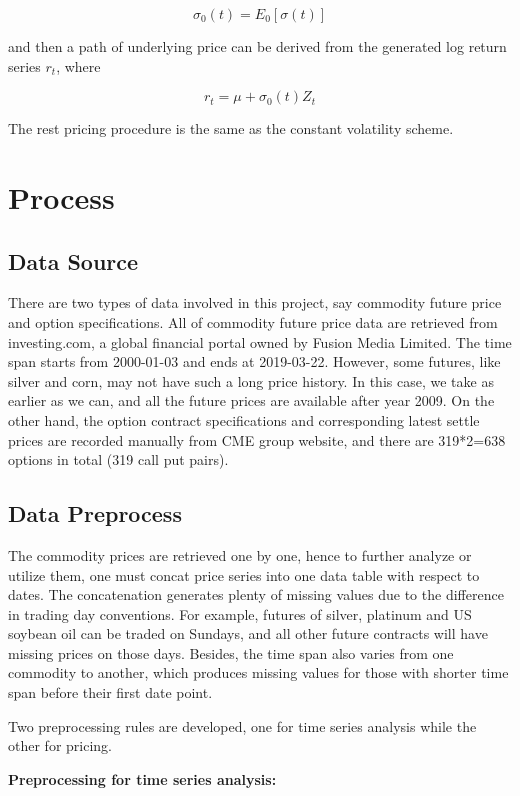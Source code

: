 \documentclass[10pt, a4paper, twocolumn]{article} %
\begin{document}
\[ \sigma_0(t) = E_0[\sigma(t)]\]

and then a path of underlying price can be derived from the generated log return series ${r_t}$, where

\[r_t = \mu + \sigma_0(t) Z_t\]

The rest pricing procedure is the same as the constant volatility scheme.

\section{Process}

\subsection{Data Source}

There are two types of data involved in this project, say commodity future price and option specifications. All of commodity future price data are retrieved from investing.com, a global financial portal owned by Fusion Media Limited. The time span starts from 2000-01-03 and ends at 2019-03-22. However, some futures, like silver and corn, may not have such a long price history. In this case, we take as earlier as we can, and all the future prices are available after year 2009. On the other hand, the option contract specifications and corresponding latest settle prices are recorded manually from CME group website, and there are 319*2=638 options in total (319 call put pairs).

\subsection{Data Preprocess}

The commodity prices are retrieved one by one, hence to further analyze or utilize them, one must concat price series into one data table with respect to dates. The concatenation generates plenty of missing values due to the difference in trading day conventions. For example, futures of silver, platinum and US soybean oil can be traded on Sundays, and all other future contracts will have missing prices on those days. Besides, the time span also varies from one commodity to another, which produces missing values for those with shorter time span before their first date point.

Two preprocessing rules are developed, one for time series analysis while the other for pricing.

\textbf {Preprocessing for time series analysis:}
\end{document}
